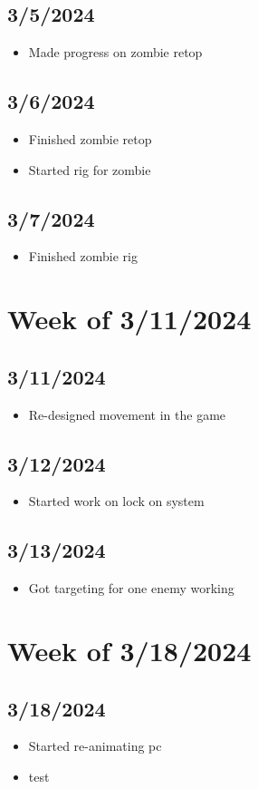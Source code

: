 \documentclass{article}
\begin{document}
\subsection*{3/5/2024}
\begin{itemize}
   \item Made progress on zombie retop
\end{itemize}
\subsection*{3/6/2024}
\begin{itemize}
   \item Finished zombie retop
   \item Started rig for zombie
\end{itemize}
\subsection*{3/7/2024}
\begin{itemize}
   \item Finished zombie rig
\end{itemize}

\section*{Week of 3/11/2024}
\subsection*{3/11/2024}
\begin{itemize}
   \item Re-designed movement in the game
\end{itemize}
\subsection*{3/12/2024}
\begin{itemize}
   \item Started work on lock on system
\end{itemize}
\subsection*{3/13/2024}
\begin{itemize}
   \item Got targeting for one enemy working
\end{itemize}

\section*{Week of 3/18/2024}
\subsection*{3/18/2024}
\begin{itemize}
   \item Started re-animating pc
   \item test
\end{itemize}
\end{document}
